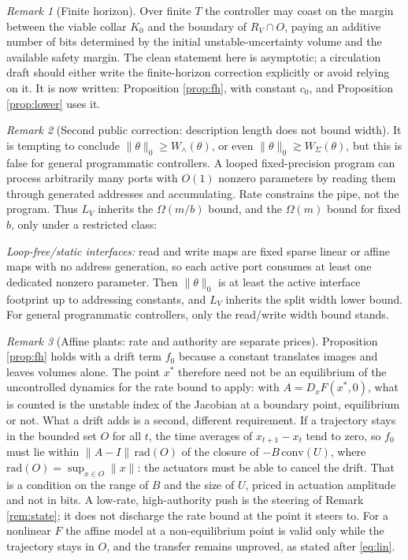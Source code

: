 \documentclass[11pt]{article}
\theoremstyle{definition}
\theoremstyle{remark}
\newtheorem{remark}{Remark}[section]
\newcommand{\RV}{R_V}
\newcommand{\W}{W}
\begin{document}
\begin{remark}[Finite horizon]\label{rem:finite}
Over finite $T$ the controller may coast on the margin between the viable collar $K_0$ and the boundary of $\RV\cap O$, paying an additive number of bits determined by the initial unstable-uncertainty volume and the available safety margin. The clean statement here is asymptotic; a circulation draft should either write the finite-horizon correction explicitly or avoid relying on it. It is now written: Proposition \ref{prop:fh}, with constant $c_0$, and Proposition \ref{prop:lower} uses it.
\end{remark}

\begin{remark}[Second public correction: description length does not bound width]\label{rem:desc}
It is tempting to conclude $\|\theta\|_0\ge\W_\wedge(\theta)$, or even $\|\theta\|_0\gtrsim\W_\Sigma(\theta)$, but this is false for general programmatic controllers. A looped fixed-precision program can process arbitrarily many ports with $O(1)$ nonzero parameters by reading them through generated addresses and accumulating. Rate constrains the pipe, not the program. Thus $L_V$ inherits the $\Omega(m/b)$ bound, and the $\Omega(m)$ bound for fixed $b$, only under a restricted class:

\emph{Loop-free/static interfaces:} read and write maps are fixed sparse linear or affine maps with no address generation, so each active port consumes at least one dedicated nonzero parameter. Then $\|\theta\|_0$ is at least the active interface footprint up to addressing constants, and $L_V$ inherits the split width lower bound. For general programmatic controllers, only the read/write width bound stands.
\end{remark}

\begin{remark}[Affine plants: rate and authority are separate prices]\label{rem:affine}
Proposition \ref{prop:fh} holds with a drift term $f_0$ because a constant translates images and leaves volumes alone. The point $x^*$ therefore need not be an equilibrium of the uncontrolled dynamics for the rate bound to apply: with $A=D_xF(x^*,0)$, what is counted is the unstable index of the Jacobian at a boundary point, equilibrium or not. What a drift adds is a second, different requirement. If a trajectory stays in the bounded set $O$ for all $t$, the time averages of $x_{t+1}-x_t$ tend to zero, so $f_0$ must lie within $\|A-I\|\,\mathrm{rad}(O)$ of the closure of $-B\,\mathrm{conv}(U)$, where $\mathrm{rad}(O)=\sup_{x\in O}\|x\|$: the actuators must be able to cancel the drift. That is a condition on the range of $B$ and the size of $U$, priced in actuation amplitude and not in bits. A low-rate, high-authority push is the steering of Remark \ref{rem:state}; it does not discharge the rate bound at the point it steers to. For a nonlinear $F$ the affine model at a non-equilibrium point is valid only while the trajectory stays in $O$, and the transfer remains unproved, as stated after \eqref{eq:lin}.
\end{remark}
\end{document}
